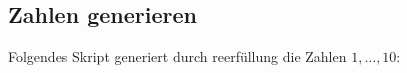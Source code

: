 




\subsection{Zahlen generieren}
Folgendes Skript generiert durch reerfüllung die Zahlen $1, \dots, 10$:

\inputminted[numbersep=5pt, tabsize=4]{prolog}{scripts/prolog/zahlen-bis-10.pl}

